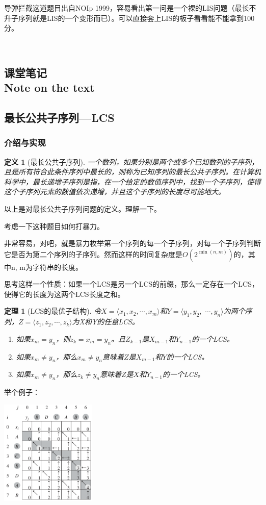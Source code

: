 \documentclass{article}
\newtheorem{definition}{定义}[subsection]
\newtheorem{thm}{定理}[subsection]
\theoremstyle{nonumberplain}
\newcommand{\note}{\ \par
	\subsection*{课堂笔记\\\tiny{Note on the text}}
	\newpage}
\begin{document}
导弹拦截这道题目出自NOIp 1999，容易看出第一问是一个裸的LIS问题（最长不升子序列就是LIS的一个变形而已）。可以直接套上LIS的板子看看能不能拿到100分。


\note
\subsection{最长公共子序列---LCS}
\subsubsection{介绍与实现}
\begin{definition}[最长公共子序列]
一个数列，如果分别是两个或多个已知数列的子序列，且是所有符合此条件序列中最长的，则称为已知序列的最长公共子序列。在计算机科学中，最长递增子序列是指，在一个给定的数值序列中，找到一个子序列，使得这个子序列元素的数值依次递增，并且这个子序列的长度尽可能地大。
\end{definition}

以上是对最长公共子序列问题的定义。理解一下。

考虑一下这种题目如何打暴力。

非常容易，对吧，就是暴力枚举第一个序列的每一个子序列，对每一个子序列判断它是否为第二个序列的子序列。然而这样的时间复杂度是$O(2^{\min(n,m)})$的，其中n, m为字符串的长度。

思考这样一个性质：如果一个LCS是另一个LCS的前缀，那么一定存在一个LCS，使得它的长度为这两个LCS长度之和。

\begin{thm}[LCS的最优子结构]
	令$X=\langle x_1, x_2, \cdots, x_m\rangle$和$Y=\langle y_1, y_2,$ $\cdots,y_n\rangle$为两个序列，$Z=\langle z_1, z_2, \cdots, z_k\rangle$为X和Y的任意LCS。
	\begin{enumerate}
		\item{如果$x_m=y_n$，则$z_k=x_m=y_n$。且$Z_{k-1}$是$X_{m-1}$和$Y_{n-1}$的一个LCS。}
		\item{如果$x_m\neq y_n$，那么$x_m\neq y_n$意味着$Z$是$X_{m-1}$和$Y$的一个LCS。}
		\item{如果$x_m\neq y_n$，那么$z_k\neq y_n$意味着$Z$是$X$和$Y_{n-1}$的一个LCS。}
	\end{enumerate}
\end{thm}

举个例子：
\begin{center}\includegraphics[height=5cm]{CLRS_LCS.png}\end{center}
\end{document}
